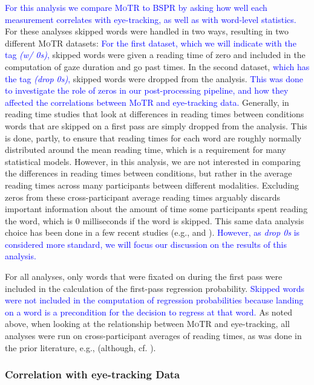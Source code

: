 \documentclass[12pt]{article}
\newcommand{\motr}{\textsc{MoTR}\xspace}
\newcommand{\word}[1]{\textit{#1}}
\newcommand{\change}[1]{\textcolor{blue}{#1}}
\begin{document}
{\change{For this analysis we compare \motr to BSPR by asking how well each measurement correlates with eye-tracking, as well as with word-level statistics.} For these analyses skipped words were handled in two ways, resulting in two different \motr datasets: \change{For the first dataset, which we will indicate with the tag \word{(w/ 0s)},} skipped words were given a reading time of zero and included in the computation of gaze duration and go past times. In the second dataset, \change{which has the tag \word{(drop 0s)},} skipped words were dropped from the analysis. \change{This was done to investigate the role of zeros in our post-processing pipeline, and how they affected the correlations between MoTR and eye-tracking data.} Generally, in reading time studies that look at differences in reading times between conditions words that are skipped on a first pass are simply dropped from the analysis. This is done, partly, to ensure that reading times for each word are roughly normally distributed around the mean reading time, which is a requirement for many statistical models. However, in this analysis, we are not interested in comparing the differences in reading times between conditions, but rather in the average reading times across many participants between different modalities. Excluding zeros from these cross-participant average reading times arguably discards important information about the amount of time some participants spent reading the word, which is 0 milliseconds if the word is skipped. This same data analysis choice has been done in a few recent studies (e.g., \citealp{pimentel2022effect} and \citealp{wilcox2023testing}). \change{However, as \word{drop 0s} is considered more standard, we will focus our discussion on the results of this analysis.}

For all analyses, only words that were fixated on during the first pass were included in the calculation of the first-pass regression probability. \change{Skipped words were not included in the computation of regression probabilities because landing on a word is a precondition for the decision to regress at that word.} As noted above, when looking at the relationship between \motr and eye-tracking, all analyses were run on cross-participant averages of reading times, as was done in the prior literature, e.g., \citet{smith2013effect, wilcox2020predictive} (although, cf. \citealp{hoover-etal-2021-linguistic}). 


\subsubsection{Correlation with eye-tracking Data} \label{sec:eyetracking-correlation}

}
\end{document}

